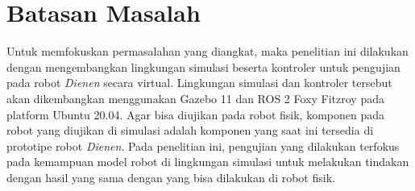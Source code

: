 \section{Batasan Masalah}
\label{sec:batasanmasalah}

Untuk memfokuskan permasalahan yang diangkat,
  maka penelitian ini dilakukan dengan mengembangkan lingkungan simulasi beserta kontroler untuk pengujian pada robot \emph{Dienen} secara virtual.
Lingkungan simulasi dan kontroler tersebut akan dikembangkan menggunakan Gazebo 11 dan ROS 2 Foxy Fitzroy pada platform Ubuntu 20.04.
Agar bisa diujikan pada robot fisik,
  komponen pada robot yang diujikan di simulasi adalah komponen yang saat ini tersedia di prototipe robot \emph{Dienen}.
Pada penelitian ini, pengujian yang dilakukan terfokus pada kemampuan model robot di lingkungan simulasi untuk melakukan tindakan dengan hasil yang sama dengan yang bisa dilakukan di robot fisik.
